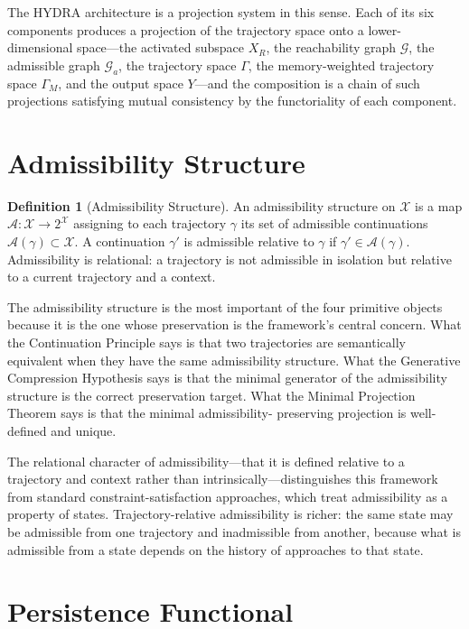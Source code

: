 \documentclass[12pt, oneside]{book}
\theoremstyle{flyxion}
\theoremstyle{definition}
\newtheorem{definition}[theorem]{Definition}
\begin{document}
The HYDRA architecture is a projection system in this sense.
Each of its six components produces a projection of the
trajectory space onto a lower-dimensional space---the
activated subspace $X_R$, the reachability graph
$\mathcal{G}$, the admissible graph $\mathcal{G}_a$, the
trajectory space $\Gamma$, the memory-weighted trajectory
space $\Gamma_M$, and the output space $Y$---and the
composition is a chain of such projections satisfying mutual
consistency by the functoriality of each component.

\section{Admissibility Structure}

\begin{definition}[Admissibility Structure]
\label{def:admissibility}
An admissibility structure on $\mathcal{X}$ is a map
$\mathcal{A} : \mathcal{X} \to 2^{\mathcal{X}}$ assigning
to each trajectory $\gamma$ its set of admissible
continuations $\mathcal{A}(\gamma) \subset \mathcal{X}$.
A continuation $\gamma'$ is admissible relative to $\gamma$
if $\gamma' \in \mathcal{A}(\gamma)$. Admissibility is
relational: a trajectory is not admissible in isolation but
relative to a current trajectory and a context.
\end{definition}

The admissibility structure is the most important of the
four primitive objects because it is the one whose
preservation is the framework's central concern. What the
Continuation Principle says is that two trajectories are
semantically equivalent when they have the same admissibility
structure. What the Generative Compression Hypothesis says
is that the minimal generator of the admissibility structure
is the correct preservation target. What the Minimal
Projection Theorem says is that the minimal admissibility-
preserving projection is well-defined and unique.

The relational character of admissibility---that it is
defined relative to a trajectory and context rather than
intrinsically---distinguishes this framework from standard
constraint-satisfaction approaches, which treat admissibility
as a property of states. Trajectory-relative admissibility
is richer: the same state may be admissible from one
trajectory and inadmissible from another, because what
is admissible from a state depends on the history of
approaches to that state.

\section{Persistence Functional}
\end{document}
